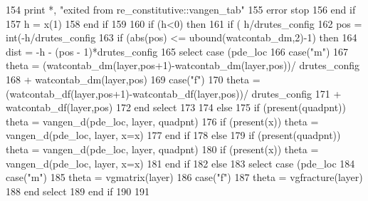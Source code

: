 \begin{DoxyCode}
154           print *, \textcolor{stringliteral}{"exited from re\_constitutive::vangen\_tab"}
155           error stop
156 \textcolor{keywordflow}{        end if}
157         h = x(1)
158 \textcolor{keywordflow}{      end if}
159 
160      \textcolor{keywordflow}{if} (h<0) \textcolor{keywordflow}{then}
161         \textcolor{keywordflow}{if} ( h/drutes_config%
162           pos = int(-h/drutes_config%
163           \textcolor{keywordflow}{if} (abs(pos) <= ubound(watcontab\_dm,2)-1) \textcolor{keywordflow}{then}
164             dist = -h - (pos - 1)*drutes_config%
165             \textcolor{keywordflow}{select case} (pde\_loc%
166               \textcolor{keywordflow}{case}(\textcolor{stringliteral}{"m"})
167                 theta = (watcontab\_dm(layer,pos+1)-watcontab\_dm(layer,pos))/
      drutes_config%
168 \textcolor{comment}{            + watcontab\_dm(layer,pos)}
169 \textcolor{comment}{              }\textcolor{keywordflow}{case}(\textcolor{stringliteral}{"f"})
170                 theta = (watcontab\_df(layer,pos+1)-watcontab\_df(layer,pos))/
      drutes_config%
171 \textcolor{comment}{             + watcontab\_df(layer,pos)}
172 \textcolor{comment}{}\textcolor{keywordflow}{            end select}
173 
174           \textcolor{keywordflow}{else}
175             \textcolor{keywordflow}{if} (\textcolor{keyword}{present}(quadpnt)) theta = vangen_d(pde\_loc, layer, quadpnt\textcolor{comment}{)}
176 \textcolor{comment}{            }\textcolor{keywordflow}{if} (\textcolor{keyword}{present}(x)) theta = vangen_d(pde\_loc, layer, x=x)
177 \textcolor{keywordflow}{          end if}
178         \textcolor{keywordflow}{else}
179           \textcolor{keywordflow}{if} (\textcolor{keyword}{present}(quadpnt)) theta = vangen_d(pde\_loc, layer, quadpnt\textcolor{comment}{)}
180 \textcolor{comment}{          }\textcolor{keywordflow}{if} (\textcolor{keyword}{present}(x)) theta = vangen_d(pde\_loc, layer, x=x)
181 \textcolor{keywordflow}{        end if}
182     \textcolor{keywordflow}{else}
183       \textcolor{keywordflow}{select case} (pde\_loc%
184         \textcolor{keywordflow}{case}(\textcolor{stringliteral}{"m"})
185            theta = vgmatrix(layer)%
186         \textcolor{keywordflow}{case}(\textcolor{stringliteral}{"f"})
187            theta = vgfracture(layer)%
188 \textcolor{keywordflow}{        end select}
189 \textcolor{keywordflow}{    end if}
190       
191 
\end{DoxyCode}



